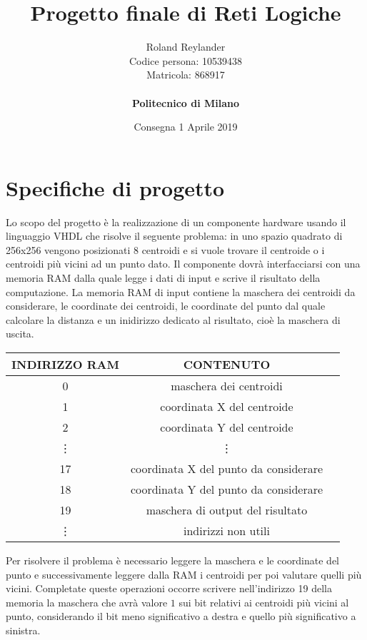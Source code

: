 \documentclass{article}
\title{\textbf{Progetto finale di Reti Logiche}}
\author{Roland Reylander \\
	\hspace{3em} Codice persona: 10539438 \\
	Matricola: 868917 \\
	\vspace*{0.5in} \\
	\textbf{Politecnico di Milano}}
\date{Consegna 1 Aprile 2019}
\begin{document}
	
	\maketitle
	\leavevmode
	
	\pagebreak
	\tableofcontents
	
	
	\pagebreak
	
	\section{Specifiche di progetto}
	Lo scopo del progetto \`e la realizzazione di un componente hardware usando il linguaggio VHDL che risolve il seguente problema: in uno spazio quadrato di 256x256 vengono posizionati 8 centroidi e si vuole trovare il centroide o i centroidi pi\`{u} vicini ad un punto dato.\medskip
	\newline 
	Il componente dovr\`{a} interfacciarsi con una memoria RAM dalla quale legge i dati di input e scrive il risultato della computazione. La memoria RAM di input contiene la maschera dei centroidi da considerare, le coordinate dei centroidi, le coordinate del punto dal quale calcolare la distanza e un inidirizzo dedicato al risultato, cio\`{e} la maschera di uscita.
	\newline
	
	\renewcommand{\arraystretch}{1.5}
	\begin{center}
		
		\begin{tabular}{ |c|c|c| }
			\hline
			INDIRIZZO RAM & CONTENUTO \\ 
			\hline
			0 & maschera dei centroidi \\
			\hline
			1 & coordinata X del centroide \\
			\hline
			2 & coordinata Y del centroide \\
			\hline
			\vdots & \vdots \\
			\hline
			17 & coordinata X del punto da considerare \\
			\hline
			18 & coordinata Y del punto da considerare \\
			\hline
			19 & maschera di output del risultato \\
			\hline
			\vdots & indirizzi non utili \\
			\hline
		\end{tabular}
	\end{center}
	\leavevmode\newline
	Per risolvere il problema \`{e} necessario leggere la maschera e le coordinate del punto e successivamente leggere dalla RAM i centroidi per poi valutare quelli pi\`{u} vicini. Completate queste operazioni occorre scrivere nell'indirizzo 19 della memoria la maschera che avr\`{a} valore $1$ sui bit relativi ai centroidi pi\`{u} vicini al punto, considerando il bit meno significativo a destra e quello pi\`{u} significativo a sinistra.
	
\end{document}
